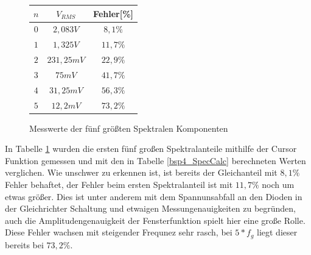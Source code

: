 \begin{figure}[H]
  \begin{center}
    \begin{tabular}{|c|c|c|} \hline
    $n$ & $V_{RMS}$ & Fehler[\%] \\ \hline
    $0$ & $2,083V$  & $8,1\%$   \\ \hline
    $1$ & $1,325V$    & $11,7\%$\\ \hline
    $2$ & $231,25mV$  & $22,9\%$\\ \hline
    $3$ & $75mV$      & $41,7\%$\\ \hline
    $4$ & $31,25mV$   & $56,3\%$\\ \hline
    $5$ & $12,2mV$    & $73,2\%$\\ \hline
    \end{tabular}
  \end{center}
  \caption{Messwerte der f\"unf gr\"o\ss{}ten Spektralen Komponenten} \label{bsp4_SpecMess}
\end{figure}
\noindent
In Tabelle \ref{bsp4_SpecMess} wurden die ersten f\"unf gro\ss{}en Spektralanteile mithilfe der Cursor Funktion gemessen und mit den in Tabelle \ref{bsp4_SpecCalc} berechneten Werten verglichen. Wie unschwer zu erkennen ist, ist bereits der Gleichanteil mit $8,1\%$ Fehler behaftet, der Fehler beim ersten Spektralanteil ist mit $11,7\%$ noch um etwas gr\"o\ss{}er. Dies ist unter anderem mit dem Spannunsabfall an den Dioden in der Gleichrichter Schaltung und etwaigen Messungenauigkeiten zu begr\"unden, auch die Amplitudengenauigkeit der Fensterfunktion spielt hier eine große Rolle. Diese Fehler wachsen mit steigender Frequnez sehr rasch, bei $5*f_g$ liegt dieser bereits bei $73,2\%$.

